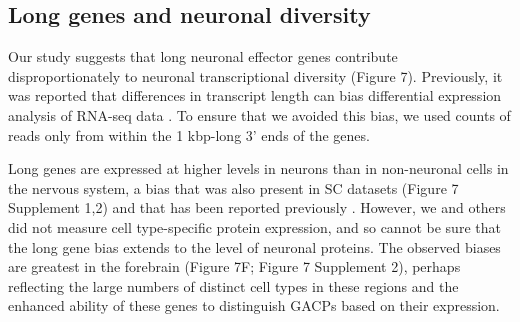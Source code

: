 \subsection{Long genes and neuronal diversity}
Our study suggests that long neuronal effector genes contribute disproportionately to neuronal transcriptional diversity (Figure 7). Previously, it was reported that differences in transcript length can bias differential expression analysis of RNA-seq data \citep{Oshlack_2009}. To ensure that we avoided this bias, we used counts of reads only from within the 1 kbp-long 3' ends of the genes. 

Long genes are expressed at higher levels in neurons than in non-neuronal cells in the nervous system, a bias that was also present in SC datasets (Figure 7 Supplement 1,2) and that has been reported previously \citep{Sugino_2014,Gabel_2015,Zylka_2015}. However, we and others did not measure cell type-specific protein expression, and so cannot be sure that the long gene bias extends to the level of neuronal proteins. The observed biases are greatest in the forebrain (Figure 7F; Figure 7 Supplement 2), perhaps reflecting the large numbers of distinct cell types in these regions and the enhanced ability of these genes to distinguish GACPs based on their expression. 

